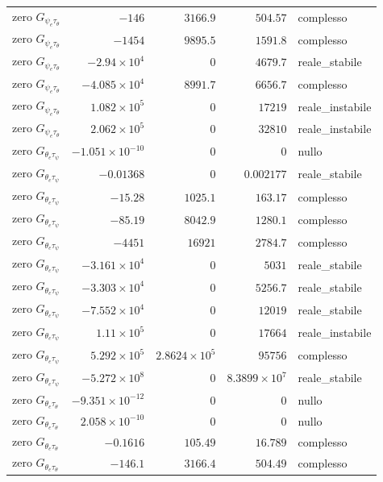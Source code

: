 \documentclass[10pt,a4paper]{article}
\numberwithin{equation}{section}
\begin{document}
\begin{longtable}{lrrrl}
zero $G_{\psi_e\tau_\theta}$ & $-146$ & $3166.9$ & $504.57$ & complesso \\
zero $G_{\psi_e\tau_\theta}$ & $-1454$ & $9895.5$ & $1591.8$ & complesso \\
zero $G_{\psi_e\tau_\theta}$ & $-2.94\times10^{4}$ & $0$ & $4679.7$ & reale\_stabile \\
zero $G_{\psi_e\tau_\theta}$ & $-4.085\times10^{4}$ & $8991.7$ & $6656.7$ & complesso \\
zero $G_{\psi_e\tau_\theta}$ & $1.082\times10^{5}$ & $0$ & $17219$ & reale\_instabile \\
zero $G_{\psi_e\tau_\theta}$ & $2.062\times10^{5}$ & $0$ & $32810$ & reale\_instabile \\
\midrule
zero $G_{\theta_e\tau_\psi}$ & $-1.051\times10^{-10}$ & $0$ & $0$ & nullo \\
zero $G_{\theta_e\tau_\psi}$ & $-0.01368$ & $0$ & $0.002177$ & reale\_stabile \\
zero $G_{\theta_e\tau_\psi}$ & $-15.28$ & $1025.1$ & $163.17$ & complesso \\
zero $G_{\theta_e\tau_\psi}$ & $-85.19$ & $8042.9$ & $1280.1$ & complesso \\
zero $G_{\theta_e\tau_\psi}$ & $-4451$ & $16921$ & $2784.7$ & complesso \\
zero $G_{\theta_e\tau_\psi}$ & $-3.161\times10^{4}$ & $0$ & $5031$ & reale\_stabile \\
zero $G_{\theta_e\tau_\psi}$ & $-3.303\times10^{4}$ & $0$ & $5256.7$ & reale\_stabile \\
zero $G_{\theta_e\tau_\psi}$ & $-7.552\times10^{4}$ & $0$ & $12019$ & reale\_stabile \\
zero $G_{\theta_e\tau_\psi}$ & $1.11\times10^{5}$ & $0$ & $17664$ & reale\_instabile \\
zero $G_{\theta_e\tau_\psi}$ & $5.292\times10^{5}$ & $2.8624\times10^{5}$ & $95756$ & complesso \\
zero $G_{\theta_e\tau_\psi}$ & $-5.272\times10^{8}$ & $0$ & $8.3899\times10^{7}$ & reale\_stabile \\
\midrule
zero $G_{\theta_e\tau_\theta}$ & $-9.351\times10^{-12}$ & $0$ & $0$ & nullo \\
zero $G_{\theta_e\tau_\theta}$ & $2.058\times10^{-10}$ & $0$ & $0$ & nullo \\
zero $G_{\theta_e\tau_\theta}$ & $-0.1616$ & $105.49$ & $16.789$ & complesso \\
zero $G_{\theta_e\tau_\theta}$ & $-146.1$ & $3166.4$ & $504.49$ & complesso \\

\end{longtable}
\end{document}
